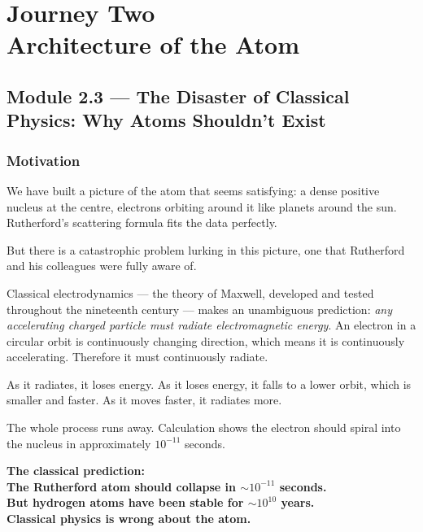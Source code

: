\documentclass[12pt, a4paper]{book}
\begin{document}
\setcounter{chapter}{1}
\chapter[Journey 2 --- Architecture of the Atom]
        {Journey Two\\[8pt]
         \textcolor{ModuleColor}{\large Architecture of the Atom}}
\setcounter{section}{2}

\section{Module 2.3 --- The Disaster of Classical Physics: Why Atoms Shouldn't Exist}
\label{sec:mod2.3}

\subsection*{Motivation}

We have built a picture of the atom that seems satisfying:
a dense positive nucleus at the centre, electrons orbiting
around it like planets around the sun.
Rutherford's scattering formula fits the data perfectly.

But there is a catastrophic problem lurking in this picture,
one that Rutherford and his colleagues were fully aware of.

Classical electrodynamics --- the theory of Maxwell,
developed and tested throughout the nineteenth century ---
makes an unambiguous prediction:
\emph{any accelerating charged particle must radiate
electromagnetic energy}.
An electron in a circular orbit is continuously
changing direction, which means it is continuously
accelerating.
Therefore it must continuously radiate.

As it radiates, it loses energy.
As it loses energy, it falls to a lower orbit,
which is smaller and faster.
As it moves faster, it radiates more.

The whole process runs away.
Calculation shows the electron should spiral into
the nucleus in approximately $10^{-11}$ seconds.

\begin{center}
\begin{tcolorbox}[enhanced, colback=CrisisRed!7, colframe=CrisisRed,
  width=0.88\textwidth, arc=3pt]
\centering\sffamily\normalsize\bfseries
The classical prediction:\\[6pt]
\normalfont\sffamily\small
The Rutherford atom should collapse in $\sim 10^{-11}$ seconds.\\[4pt]
But hydrogen atoms have been stable for $\sim 10^{10}$ years.\\[4pt]
\large\bfseries\color{CrisisRed}
Classical physics is wrong about the atom.
\end{tcolorbox}
\end{center}
\end{document}
